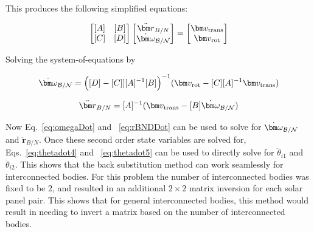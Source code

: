 This produces the following simplified equations:

\begin{equation}
	\begin{bmatrix}
		[A] & [B]\\
		[C] & [D]
	\end{bmatrix} \begin{bmatrix}
		\ddot{\bm r}_{B/N}\\
		\dot{\bm\omega}_{\cal B/N}
	\end{bmatrix} = \begin{bmatrix}
		\bm v_{\text{trans}}\\
		\bm v_{\text{rot}}
	\end{bmatrix}
\end{equation}

Solving the system-of-equations by

\begin{equation}
	\dot{\bm\omega}_{\cal B/N} = \Big([D] - [C]][A]^{-1}[B]\Big)^{-1}(\bm v_{\text{rot}} - [C][A]^{-1}\bm v_{\text{trans}})
	\label{eq:omegaDot}
\end{equation}

\begin{equation}
	\ddot{\bm r}_{B/N} = [A]^{-1} (\bm v_{\text{trans}} - [B]\dot{\bm\omega}_{\cal B/N})
	\label{eq:rBNDDot}
\end{equation}

Now Eq.~\eqref{eq:omegaDot} and ~\eqref{eq:rBNDDot} can be used to solve for $\dot{\bm\omega}_{\cal B/N}$ and $\ddot{\bm r}_{B/N}$. Once these second order state variables are solved for, Eqs.~\eqref{eq:thetadot4} and ~\eqref{eq:thetadot5} can be used to directly solve for $\ddot \theta_{i1}$ and $\ddot \theta_{i2}$. This shows that the back substitution method can work seamlessly for interconnected bodies. For this problem the number of interconnected bodies was fixed to be 2, and resulted in an additional $2\times 2$ matrix inversion for each solar panel pair. This shows that for general interconnected bodies, this method would result in needing to invert a matrix based on the number of interconnected bodies.
